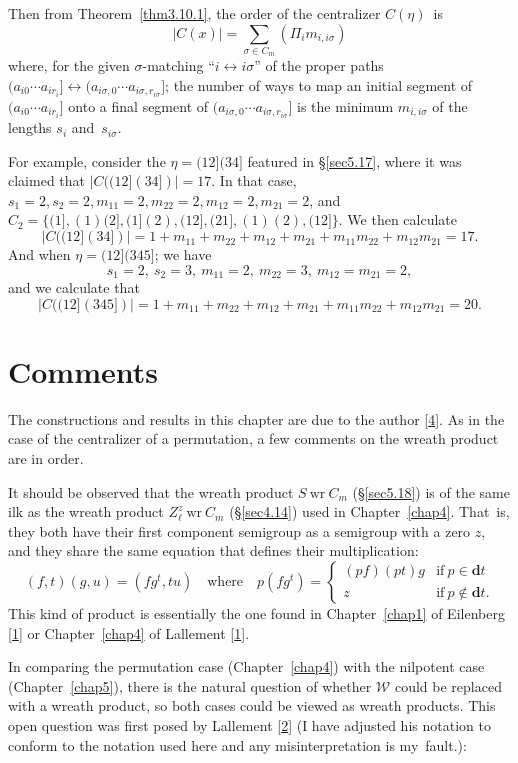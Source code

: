 \documentclass{surv-l}
\numberwithin{equation}{section}
\numberwithin{table}{section}
\numberwithin{figure}{section}
\theoremstyle{definition}
\begin{document}
Then from Theorem~\ref{thm3.10.1}, the order of the centralizer
$C(\eta)$~is
\[
|C(x)|=\sum_{\sigma\in C_{m}}(\Pi_{i}m_{i,i\sigma})
\]
where, for the given $\sigma$-matching ``$i\leftrightarrow
i\sigma$'' of the proper paths $(a_{i0}\cdots
a_{ir_{i}}]\leftrightarrow (a_{i\sigma,0}\cdots
a_{i\sigma,r_{i\sigma}}]$; the number of ways to map an initial
segment of $(a_{i0}\cdots a_{ir_{i}}]$ onto a final segment of
$(a_{i\sigma,0}\cdots a_{i\sigma,r_{i\sigma}}]$ is the minimum
$m_{i,i\sigma}$ of the lengths $s_{i}$ and~$s_{i\sigma}$.

For example, consider the $\eta=(12](34]$ featured in
\S\ref{sec5.17}, where it was claimed that $|C((12](34])|=17$. In
that case, $s_{1}=2, s_{2}=2, m_{11}=2, m_{22}= 2, m_{12}=2,
m_{21}=2$, and $C_{2}=\{(1], (1)(2], (1](2), (12], (21], (1)(2),
(12]\}$. We then calculate
\[
|C((12](34])|=1+m_{11}+m_{22}+m_{12}+m_{21}+m_{11}m_{22}+m_{12}m_{21}=17.
\]
And when $\eta=(12](345]$; we have
\[
s_{1}=2,\ s_{2}=3,\ m_{11}=2,\ m_{22}=3,\ m_{12}=m_{21}=2,
\]
and we calculate that
\[
|C((12](345])|=1+m_{11}+m_{22}+m_{12}+m_{21}+m_{11}m_{22}+m_{12}m_{21}=20.
\]

\section{Comments}\label{sec5.23}

The constructions and results in this chapter are due to the
author [\hyperlink{bib43c}{4}]. As in the case of the
centralizer of a permutation, a few comments on the wreath product
are in order.

It should be observed that the wreath product $S\ \mathrm{wr}\
C_{m}$ (\S\ref{sec5.18}) is of the same ilk as the wreath product
$Z_{\ell}^{z}\ \mathrm{wr}\ C_{m}$ (\S\ref{sec4.14}) used in
Chapter~\ref{chap4}. That~is, they both have their first component
semigroup as a semigroup with a zero $z$, and they share the same
equation that defines their multiplication:\index{multiplication}
\[
(f, t)(g,u) =(fg^{t}, tu)\quad \mathrm{where}\quad
p(fg^{t})=\begin{cases}
(pf)(pt)g &\mathrm{if}\ p\in \mathbf{d}t \\
z &\mathrm{if}\ p\not\in \mathbf{d}t.
\end{cases}
\]
This kind of product is essentially the one found in
Chapter~\ref{chap1} of Eilenberg
[\hyperlink{bib14}{1}] or Chapter~\ref{chap4} of
Lallement [\hyperlink{bib38}{1}].

In comparing the permutation case (Chapter~\ref{chap4}) with the
nilpotent case (Chapter~\ref{chap5}), there is the natural
question of whether $\mathcal{W}$ could be replaced with a wreath
product, so both cases could be viewed as wreath products. This
open question was first posed by Lallement
[\hyperlink{bib38a}{2}] (I have adjusted his notation to
conform to the notation used here and any misinterpretation is
my~fault.):
\end{document}
